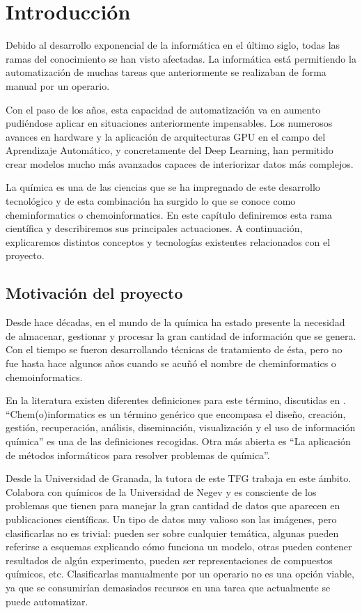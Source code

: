 \chapter{Introducción}

Debido al desarrollo exponencial de la informática en el último siglo, todas las ramas del conocimiento se han visto afectadas. La informática está permitiendo la automatización de muchas tareas que anteriormente se realizaban de forma manual por un operario. 

Con el paso de los años, esta capacidad de automatización va en aumento pudiéndose aplicar en situaciones anteriormente impensables. Los numerosos avances en hardware y la aplicación de arquitecturas GPU en el campo del Aprendizaje Automático, y concretamente del Deep Learning, han permitido crear modelos mucho más avanzados capaces de interiorizar datos más complejos. 

La química es una de las ciencias que se ha impregnado de este desarrollo tecnológico y de esta combinación ha surgido lo que se conoce como cheminformatics o chemoinformatics. En este capítulo definiremos esta rama científica y describiremos sus principales actuaciones. A continuación, explicaremos distintos conceptos y tecnologías existentes relacionados con el proyecto.

\section{Motivación del proyecto}
Desde hace décadas, en el mundo de la química ha estado presente la necesidad de almacenar, gestionar y procesar la gran cantidad de información que se genera. Con el tiempo se fueron desarrollando técnicas de tratamiento de ésta, pero no fue hasta hace algunos años cuando se acuñó el nombre de cheminformatics o chemoinformatics. 

En la literatura existen diferentes definiciones para este término, discutidas en \cite{doi:10.1021/ci600234z}. ``Chem(o)informatics es un término genérico que encompasa el diseño, creación, gestión, recuperación, análisis, diseminación, visualización y el uso de información química'' es una de las definiciones recogidas. Otra más abierta es ``La aplicación de métodos informáticos para resolver problemas de química''. 

Desde la Universidad de Granada, la tutora de este TFG trabaja en este ámbito. Colabora con químicos de la Universidad de Negev y es consciente de los problemas que tienen para manejar la gran cantidad de datos que aparecen en publicaciones científicas. Un tipo de datos muy valioso son las imágenes, pero clasificarlas no es trivial: pueden ser sobre cualquier temática, algunas pueden referirse a esquemas explicando cómo funciona un modelo, otras pueden contener resultados de algún experimento, pueden ser representaciones de compuestos químicos, etc. Clasificarlas manualmente por un operario no es una opción viable, ya que se consumirían demasiados recursos en una tarea que actualmente se puede automatizar.

